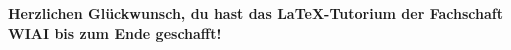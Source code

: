 



\newpage
\setcounter{page}{2}
\tableofcontents
\newpage
\listoffigures
\newpage
\listoftables
\newpage
\setcounter{page}{1}

\newpage

\newpage


\textbf{Herzlichen Glückwunsch, du hast das \LaTeX -Tutorium der Fachschaft WIAI bis zum Ende geschafft!}


